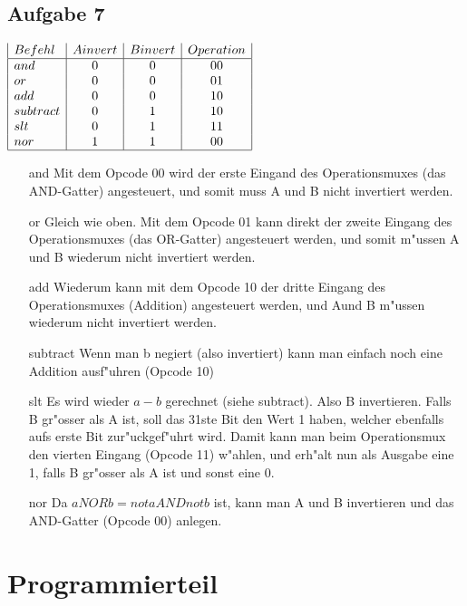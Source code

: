 \documentclass[a4paper,abstracton]{scrartcl}
\begin{document}
\subsection{Aufgabe 7}
$\begin{array}{|l|c|c|c|}
Befehl & A invert & B invert & Operation\\
\hline
and &0&0&0 0\\
or &0&0&0 1\\
add &0&0&1 0\\
subtract &0&1&1 0\\
slt &0&1&1 1\\
nor &1&1&0 0\\
\hline
\end{array}$\\
\begin{itemize}
	\item[and] Mit dem Opcode 00 wird der erste Eingand des Operationsmuxes (das AND-Gatter) angesteuert, 
	und somit muss A und B nicht invertiert werden.
	\item[or] Gleich wie oben. Mit dem Opcode 01 kann direkt der zweite Eingang des Operationsmuxes (das OR-Gatter) 
	angesteuert werden, und somit m"ussen A und B wiederum nicht invertiert werden.
	\item[add] Wiederum kann mit dem Opcode 10 der dritte Eingang des Operationsmuxes (Addition) angesteuert werden, 
	und Aund B m"ussen wiederum nicht invertiert werden.
	\item[subtract] Wenn man b negiert (also invertiert) kann man einfach noch eine Addition ausf"uhren (Opcode 10)
	\item[slt] Es wird wieder $a-b$ gerechnet (siehe subtract). Also B invertieren. 
	Falls B gr"osser als A ist, soll das 31ste Bit den Wert 1 haben, welcher ebenfalls aufs erste Bit zur"uckgef"uhrt wird. 
	Damit kann man beim Operationsmux den vierten Eingang (Opcode 11) w"ahlen, und erh"alt nun als Ausgabe eine 1, 
	falls B gr"osser als A ist und sonst eine 0.
	\item[nor] Da $ a NOR b = not a AND not b $ ist, kann man A und B invertieren und das AND-Gatter (Opcode 00) anlegen.
\end{itemize}

\newpage

\section{Programmierteil}

\newpage

\newpage

\end{document}
